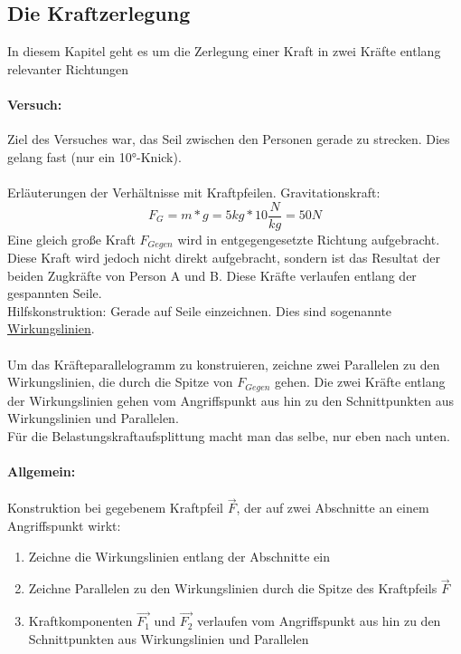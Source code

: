 \documentclass[12pt]{article}
\numberwithin{equation}{subsection}
\begin{document}
	\subsection{Die Kraftzerlegung}
	In diesem Kapitel geht es um die Zerlegung einer Kraft in zwei Kräfte entlang relevanter Richtungen
	\paragraph{Versuch:}
	Ziel des Versuches war, das Seil zwischen den Personen gerade zu strecken. Dies gelang fast (nur ein 10°-Knick).\\\\
	Erläuterungen der Verhältnisse mit Kraftpfeilen. Gravitationskraft:
	\begin{equation}
		F_G=m*g=5kg*10\dfrac{N}{kg}=50N
	\end{equation}
	Eine gleich große Kraft $ F_{Gegen} $ wird in entgegengesetzte Richtung aufgebracht. Diese Kraft wird jedoch nicht direkt aufgebracht, sondern ist das Resultat der beiden Zugkräfte von Person A und B. Diese Kräfte verlaufen entlang der gespannten Seile.\\
	Hilfskonstruktion: Gerade auf Seile einzeichnen. Dies sind sogenannte \underline{Wirkungslinien}.\\\\
	Um das Kräfteparallelogramm zu konstruieren, zeichne zwei Parallelen zu den Wirkungslinien, die durch die Spitze von $ F_{Gegen} $ gehen. Die zwei Kräfte entlang der Wirkungslinien gehen vom Angriffspunkt aus hin zu den Schnittpunkten aus Wirkungslinien und Parallelen.\\
	Für die Belastungskraftaufsplittung macht man das selbe, nur eben nach unten.
	
	\paragraph{Allgemein:}
	Konstruktion bei gegebenem Kraftpfeil $ \vec{F} $, der auf zwei Abschnitte an einem Angriffspunkt wirkt:
	\begin{enumerate}
		\item Zeichne die Wirkungslinien entlang der Abschnitte ein
		\item Zeichne Parallelen zu den Wirkungslinien durch die Spitze des Kraftpfeils $ \vec{F} $
		\item Kraftkomponenten $ \vec{F_1} $ und $ \vec{F_2} $ verlaufen vom Angriffspunkt aus hin zu den Schnittpunkten aus Wirkungslinien und Parallelen
	\end{enumerate}
\end{document}
